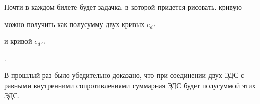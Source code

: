 Почти в каждом билете будет задачка, в которой придется рисовать.
кривую
можно получить как полусумму двух кривых $e_{d\:'}$
и кривой $e_{d\:'\:'}$
.

В прошлый раз было убедительно доказано, что при соединении двух ЭДС
с равными внутренними сопротивлениями суммарная ЭДС будет
полусуммой этих ЭДС.

